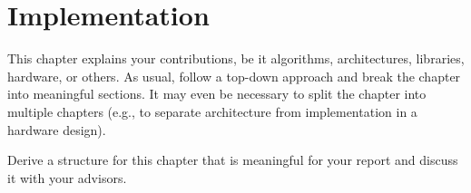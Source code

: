 \chapter{Implementation}
\label{ch:implementation}

{\color{red}
	This chapter explains your contributions, be it algorithms, architectures, libraries, hardware, or others.
	As usual, follow a top-down approach and break the chapter into meaningful sections.
	It may even be necessary to split the chapter into multiple chapters (e.g., to separate architecture from implementation in a hardware design).

	Derive a structure for this chapter that is meaningful for your report and discuss it with your advisors.
}
